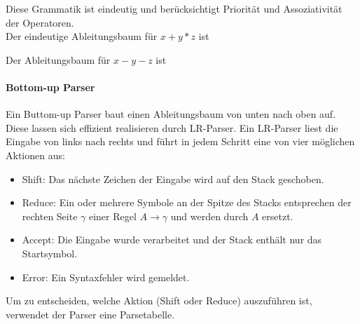 \documentclass[a4paper]{scrartcl}
\begin{document}
Diese Grammatik ist eindeutig und berücksichtigt Priorität und Assoziativität der Operatoren.\\
Der eindeutige Ableitungsbaum für $x+y*z$ ist\\

Der Ableitungsbaum für $x-y-z$ ist\\

\paragraph{Bottom-up Parser} Ein Buttom-up Parser baut einen Ableitungsbaum von unten nach oben auf. Diese lassen sich effizient realisieren durch LR-Parser. Ein LR-Parser liest die Eingabe von links nach rechts und führt in jedem Schritt eine von vier möglichen Aktionen aus:
\begin{itemize}
\item Shift: Das nächste Zeichen der Eingabe wird auf den Stack geschoben.
\item Reduce: Ein oder mehrere Symbole an der Spitze des Stacks entsprechen der rechten Seite $\gamma$ einer Regel $A \rightarrow \gamma$ und werden durch $A$ ersetzt.
\item Accept: Die Eingabe wurde verarbeitet und der Stack enthält nur das Startsymbol.
\item Error: Ein Syntaxfehler wird gemeldet.
\end{itemize}
Um zu entscheiden, welche Aktion (Shift oder Reduce) auszuführen ist, verwendet der Parser eine Parsetabelle.
\end{document}
